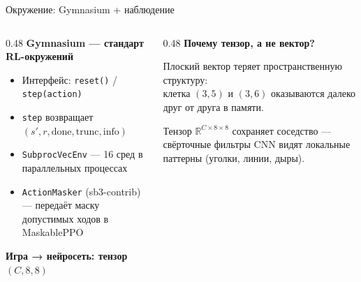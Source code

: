 \documentclass[aspectratio=169]{beamer}
\begin{document}
	\begin{frame}{Окружение: Gymnasium + наблюдение}
		\begin{columns}[t]
			\begin{column}{0.48\textwidth}
				\textbf{Gymnasium — стандарт RL-окружений}
				
				\medskip
				\begin{itemize}
					\item Интерфейс: \texttt{reset()} / \texttt{step(action)}
					\item \texttt{step} возвращает $(s', r, \text{done}, \text{trunc}, \text{info})$
					\item \texttt{SubprocVecEnv} — 16 сред в параллельных процессах
					\item \texttt{ActionMasker} (sb3-contrib) — передаёт маску допустимых ходов в MaskablePPO
				\end{itemize}
				
				\medskip
				\textbf{Игра → нейросеть: тензор $(C, 8, 8)$}
			\end{column}
			\begin{column}{0.48\textwidth}
				\textbf{Почему тензор, а не вектор?}
				
				\medskip
				Плоский вектор теряет пространственную структуру: \\
				клетка $(3,5)$ и $(3,6)$ оказываются далеко друг от друга в памяти.
				
				\medskip
				Тензор $\mathbb{R}^{C \times 8 \times 8}$ сохраняет соседство —
				свёрточные фильтры CNN видят локальные паттерны (уголки, линии, дыры).
			\end{column}
		\end{columns}
	\end{frame}
	
\end{document}
